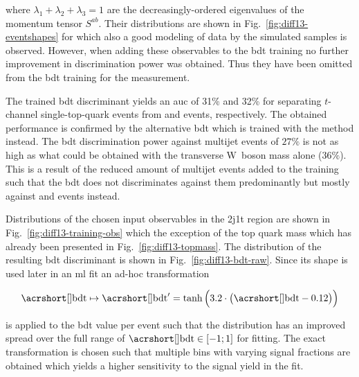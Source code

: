 where $\lambda_1+\lambda_2+\lambda_3=1$ are the decreasingly-ordered eigenvalues of the momentum tensor $S^{ab}$. Their distributions are shown in Fig.~\ref{fig:diff13-eventshapes} for which also a good modeling of data by the simulated samples is observed. However, when adding these observables to the \gls{bdt} training no further improvement in discrimination power was obtained. Thus they have been omitted from the \gls{bdt} training for the measurement.


The trained \gls{bdt} discriminant yields an \gls{auc} of 31\% and 32\% for separating $t$-channel single-top-quark events from \ttbar and \wjets events, respectively. The obtained performance is confirmed by the alternative \gls{bdt} which is trained with the \GRADIENTBOOST method instead. The \gls{bdt} discrimination power against multijet events of $27\%$ is not as high as what could be obtained with the transverse W~boson mass alone ($36\%$). This is a result of the reduced amount of multijet events added to the training such that the \gls{bdt} does not discriminates against them predominantly but mostly against \ttbar and \wjets events instead.

Distributions of the chosen input observables in the 2j1t region are shown in Fig.~\ref{fig:diff13-training-obs} which the exception of the top quark mass which has already been presented in Fig.~\ref{fig:diff13-topmass}. The distribution of the resulting \gls{bdt} discriminant is shown in Fig.~\ref{fig:diff13-bdt-raw}. Since its shape is used later in an \gls{ml} fit an ad-hoc transformation 

\begin{equation}
\bdt\mapsto\bdt^\prime=\tanh\Big(3.2\cdot\big(\bdt-0.12\big)\Big)
\end{equation}

is applied to the \gls{bdt} value per event such that the distribution has an improved spread over the full range of $\bdt\in[-1;1]$ for fitting. The exact transformation is chosen such that multiple bins with varying signal fractions are obtained which yields a higher sensitivity to the signal yield in the fit.

